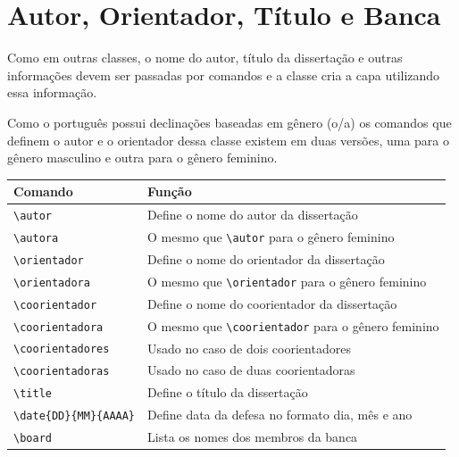 \documentclass[fleqn]{profmat-cefet}
\begin{document}
\section{Autor, Orientador, Título e Banca}
\label{sec:autor_orientador_titulo_e_banca}

Como em outras classes, o nome do autor, título da dissertação e outras
informações devem ser passadas por comandos e a classe cria a capa utilizando
essa informação.

Como o português possui declinações baseadas em gênero (o/a) os comandos que
definem o autor e o orientador dessa classe existem em duas versões, uma
para o gênero masculino e outra para o gênero feminino.
\begin{center}
    \vspace{0.5\baselineskip}
    \begin{tabular}{ll}
    	\hline
    	Comando                           & Função                                                         \\ \hline
    	{\lstinline!\autor!}              & Define o nome do autor da dissertação                          \\
    	{\lstinline!\autora!}             & O mesmo que {\lstinline!\autor!} para o gênero feminino        \\
    	{\lstinline!\orientador!}         & Define o nome do orientador da dissertação                     \\
    	{\lstinline!\orientadora!}        & O mesmo que {\lstinline!\orientador!} para o gênero feminino   \\
    	{\lstinline!\coorientador!}       & Define o nome do coorientador da dissertação                   \\
    	{\lstinline!\coorientadora!}      & O mesmo que {\lstinline!\coorientador!} para o gênero feminino \\
    	{\lstinline!\coorientadores!}     & Usado no caso de dois coorientadores                           \\
    	{\lstinline!\coorientadoras!}     & Usado no caso de duas coorientadoras                           \\
    	{\lstinline!\title!}              & Define o título da dissertação                                 \\
    	{\lstinline!\date{DD}{MM}{AAAA}!} & Define data da defesa no formato dia, mês e ano                \\
    	{\lstinline!\board!}              & Lista os nomes dos membros da banca                            \\ \hline
    \end{tabular}
    \vspace{0.5\baselineskip}
\end{center}
\end{document}
